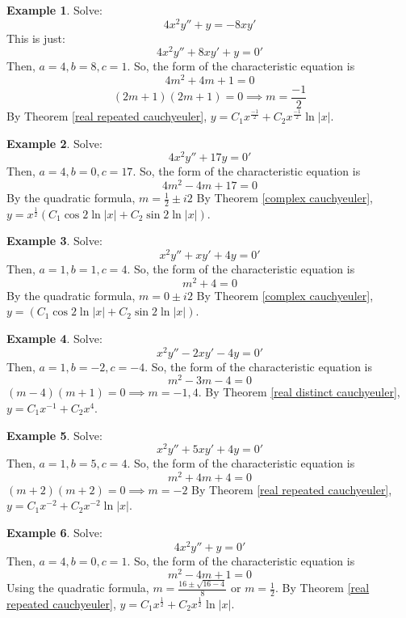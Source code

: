 \documentclass{article}
\theoremstyle{definition}
\newtheorem{example}{Example}[section]
\begin{document}
\begin{example}
    Solve: \[4x^2y'' + y = -8xy'\]
    This is just: \[4x^2y'' + 8xy' + y = 0'\]
    Then, $a = 4, b = 8, c = 1$. So, the form of the characteristic equation is  \[4m^2 + 4m + 1 = 0\]
    \[(2m + 1)(2m + 1)= 0 \implies m = \frac{-1}{2}\]
    By Theorem \ref{real repeated cauchyeuler}, $y = C_1x^{\frac{-1}{2}}+C_2x^{\frac{-1}{2}}\ln{\vert x \vert}$.
\end{example}

\begin{example}
    Solve: \[4x^2y'' + 17y = 0'\]
    Then, $a = 4, b = 0, c = 17$. So, the form of the characteristic equation is  \[4m^2 - 4m + 17 = 0\]
    By the quadratic formula, 
    $m = \frac{1}{2} \pm i2$
    By Theorem \ref{complex cauchyeuler}, $ y = x^{\frac{1}{2}}(C_1\cos{2 \ln{\vert x \vert}} + C_2\sin{2 \ln{\vert x \vert}})$.
\end{example}

\begin{example}
    Solve: \[x^2y'' + xy' + 4y = 0'\]
    Then, $a = 1, b = 1, c = 4$. So, the form of the characteristic equation is  \[m^2 + 4 = 0\]
    By the quadratic formula, 
    $m = 0 \pm i2$
    By Theorem \ref{complex cauchyeuler}, $ y = (C_1\cos{2 \ln{\vert x \vert}} + C_2\sin{2 \ln{\vert x \vert}})$.
\end{example}

\begin{example}
    Solve: \[x^2y'' - 2xy' - 4y = 0'\]
    Then, $a = 1, b = -2, c = -4$. So, the form of the characteristic equation is  \[m^2 -3m - 4 = 0\]
    $(m-4)(m+1) = 0 \implies m = -1, 4$.
    By Theorem \ref{real distinct cauchyeuler}, $y = C_1x^{-1} + C_2x^{4}$.
\end{example}

\begin{example}
    Solve: \[x^2y'' + 5xy' + 4y = 0'\]
    Then, $a = 1, b = 5, c = 4$. So, the form of the characteristic equation is  \[m^2 + 4m + 4 = 0\]
    $(m+2)(m+2) = 0 \implies m = -2$
    By Theorem \ref{real repeated cauchyeuler}, $y = C_1x^{-2}+C_2x^{-2}\ln{\vert x \vert}$.
\end{example}

\begin{example}
    Solve: \[4x^2y'' + y = 0'\]
    Then, $a = 4, b = 0, c = 1$. So, the form of the characteristic equation is  \[m^2 - 4m + 1 = 0\]
    Using the quadratic formula, 
    $m = \frac{16 \pm \sqrt{16-4}}{8}$ or $m = \frac{1}{2}$.
    By Theorem \ref{real repeated cauchyeuler}, $y = C_1x^{\frac{1}{2}}+C_2x^{\frac{1}{2}}\ln{\vert x \vert}$.
\end{example}
\end{document}
